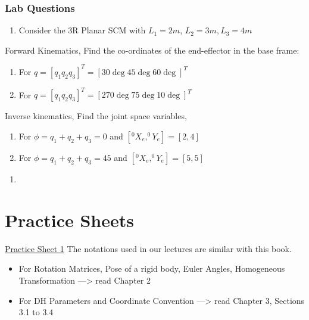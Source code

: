\documentclass[11pt]{report}
\begin{document}
\section{Lab Questions}
\label{sec:org08918d5}
\begin{enumerate}
\item Consider the 3R Planar SCM with \(L_1 = 2m\), \(L_2 = 3m, L_3 = 4m\)
\end{enumerate}
Forward Kinematics,
Find the co-ordinates of the end-effector in the base frame:
\begin{enumerate}
\item For \(q = [q_1 q_2 q_3]^T= [30\deg 45 \deg 60 \deg]^{T}\)
\item For \(q = [q_1 q_2 q_3]^T= [270\deg 75 \deg 10 \deg]^{T}\)
\end{enumerate}
Inverse kinematics,
Find the joint space variables,
\begin{enumerate}
\item For \(\phi = q_1 + q_2 + q_3 = 0\) and \([^0X_e, ^0Y_e] = [2,4]\)
\item For \(\phi = q_1 + q_2 + q_3 = 45\) and \([^0X_e, ^0Y_e] = [5,5]\)
\end{enumerate}

\begin{enumerate}
\item 
\end{enumerate}
\part{Practice Sheets}
\label{sec:org7c56995}
\href{file:///home/adithya/university-notes/Introduction To Robotics/assignments/23AID202\_ITR\_PracticeSheet01.pdf}{Practice Sheet 1}
The notations used in our lectures are similar with this book.

\begin{itemize}
\item For Rotation Matrices, Pose of a rigid body, Euler Angles, Homogeneous Transformation ---> read Chapter 2
\item For DH Parameters and Coordinate Convention ---> read Chapter 3, Sections 3.1 to 3.4
\end{itemize}
\end{document}
